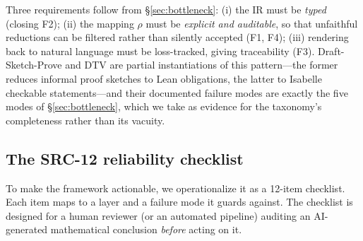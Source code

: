 \documentclass[11pt,a4paper]{article}
\begin{document}
\begin{center}
\end{center}

Three requirements follow from \S\ref{sec:bottleneck}: (i) the IR must be \emph{typed} (closing F2); (ii) the mapping $\rho$ must be \emph{explicit and auditable}, so that unfaithful reductions can be filtered rather than silently accepted (F1, F4); (iii) rendering back to natural language must be loss-tracked, giving traceability (F3). Draft-Sketch-Prove \citep{jiang2023draft} and DTV \citep{zhou2024dtv} are partial instantiations of this pattern---the former reduces informal proof sketches to Lean obligations, the latter to Isabelle checkable statements---and their documented failure modes are exactly the five modes of \S\ref{sec:bottleneck}, which we take as evidence for the taxonomy's completeness rather than its vacuity.

\subsection{The SRC-12 reliability checklist}\label{sec:checklist}

To make the framework actionable, we operationalize it as a 12-item checklist. Each item maps to a layer and a failure mode it guards against. The checklist is designed for a human reviewer (or an automated pipeline) auditing an AI-generated mathematical conclusion \emph{before} acting on it.
\end{document}
